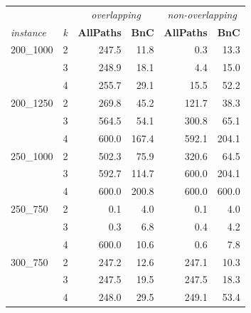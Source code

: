 \documentclass[conference]{IEEEtran}
\begin{document}
\begin{table}
\centering
\captionsetup{font=small}
\label{table:runtime}

\begin{tabular}{|ll|rr|rr|}
\hline
		 &   &  \multicolumn{2}{|c|}{\emph{overlapping}} & \multicolumn{2}{|c|}{\emph{non-overlapping}} \\
         \cline{3-6}
\emph{instance} & \emph{k} &  \textbf{AllPaths} &  \textbf{BnC} &  \textbf{AllPaths} &  \textbf{BnC} \\
\hline      
200\_1000 & 2 &     247.5 &    11.8 &       0.3 &    13.3 \\
         & 3 &     248.9 &    18.1 &       4.4 &    15.0 \\
         & 4 &     255.7 &    29.1 &      15.5 &    52.2 \\
\hline
200\_1250 & 2 &     269.8 &    45.2 &     121.7 &    38.3 \\
         & 3 &     564.5 &    54.1 &     300.8 &    65.1 \\
         & 4 &         600.0  &   167.4 &     592.1 &   204.1 \\
\hline                             
250\_1000 & 2 &     502.3 &    75.9 &     320.6 &    64.5 \\
         & 3 &     592.7 &   114.7 &     600.0       &   204.1 \\
         & 4 &         600.0  &   200.8 &         600.0   &       600.0   \\
\hline
250\_750 & 2 &       0.1 &     4.0 &       0.1 &     4.0 \\
         & 3 &       0.3 &     6.8 &       0.4 &     4.2 \\
         & 4 &       600.0    &    10.6 &       0.6 &     7.8 \\
\hline
300\_750 & 2 &     247.2 &    12.6 &     247.1 &    10.3 \\
         & 3 &     247.5 &    19.5 &     247.5 &    18.3 \\
         & 4 &     248.0 &    29.5 &     249.1 &    53.4 \\

\end{tabular}
\end{table}
\end{document}
